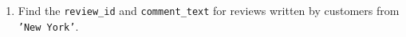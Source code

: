 \documentclass[12pt,a4paper]{article}
\begin{document}
\begin{enumerate}

    \item Find the \texttt{review\_id} and \texttt{comment\_text} for reviews written by customers from \texttt{'New York'}.






\end{enumerate}
\end{document}
